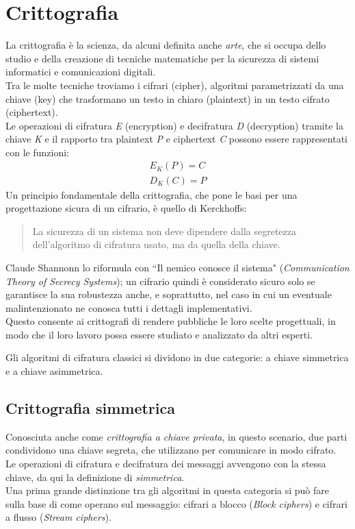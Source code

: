 \documentclass[target=bach,aauheader=,style=]{thud}
\begin{document}
    \section{Crittografia}
    La crittografia è la scienza, da alcuni definita anche \textit{arte}, che si occupa dello studio e della creazione di tecniche matematiche per la sicurezza di sistemi informatici e comunicazioni digitali.\cite{moderncrypto}\\
    Tra le molte tecniche troviamo i cifrari (cipher), algoritmi parametrizzati da una chiave (key) che trasformano un testo in chiaro (plaintext) in un testo cifrato (ciphertext).\\
    Le operazioni di cifratura \textit{E} (encryption) e decifratura \textit{D} (decryption) tramite la chiave \textit{K} e il rapporto tra plaintext \textit{P} e ciphertext \textit{C} possono essere rappresentati con le funzioni:
    \begin{align*}
    	E_K(P)=C\\
    	D_K(C)=P
    \end{align*}
    Un principio fondamentale della crittografia, che pone le basi per una progettazione sicura di un cifrario, è quello di Kerckhoffs:
    \begin{quote}
        La sicurezza di un sistema non deve dipendere dalla segretezza dell'algoritmo di cifratura usato, ma da quella della chiave.
    \end{quote}
    Claude Shannonn lo riformula con ``Il nemico conosce il sistema" (\textit{Communication Theory of Secrecy Systems}); un cifrario quindi è considerato sicuro solo se garantisce la sua robustezza anche, e soprattutto, nel caso in cui un eventuale malintenzionato ne conosca tutti i dettagli implementativi.\\
    Questo consente ai crittografi di rendere pubbliche le loro scelte progettuali, in modo che il loro lavoro possa essere studiato e analizzato da altri esperti.
    
    Gli algoritmi di cifratura classici si dividono in due categorie: a chiave simmetrica e a chiave asimmetrica.

        \subsection{Crittografia simmetrica}
        Conosciuta anche come \textit{crittografia a chiave privata}, in questo scenario, due parti condividono una chiave segreta, che utilizzano per comunicare in modo cifrato.\\
        Le operazioni di cifratura e decifratura dei messaggi avvengono con la stessa chiave, da qui la definizione di \textit{simmetrica}. \\
        Una prima grande distinzione tra gli algoritmi in questa categoria si può fare sulla base di come operano sul messaggio: cifrari a blocco (\textit{Block ciphers}) e cifrari a flusso (\textit{Stream ciphers}).
\end{document}
